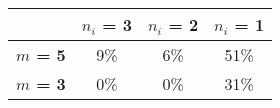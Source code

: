 \begin{tabular}{|l|c|c|c|}
\hline
&\textbf{$n_i$ = 3}&\textbf{$n_i$ = 2}&\textbf{$n_i$ = 1}\\\hline
\textbf{$m$ = 5}&9\%&6\%&51\%\\\hline
\textbf{$m$ = 3}&0\%&0\%&31\%\\\hline
\end{tabular}
